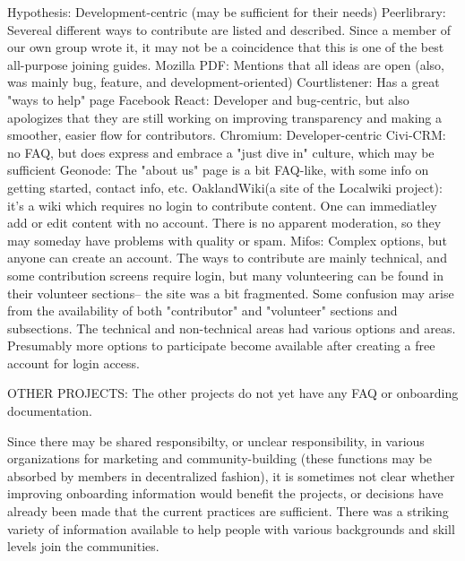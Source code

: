 Hypothesis: Development-centric (may be sufficient for their needs)
Peerlibrary: Severeal different ways to contribute are listed and described. Since a member of our own group wrote it, it may not be a coincidence that this is one of the best all-purpose joining guides.
Mozilla PDF: Mentions that all ideas are open (also, was mainly bug, feature, and development-oriented)
Courtlistener: Has a great "ways to help" page
Facebook React: Developer and bug-centric, but also apologizes that they are still working on improving transparency and making a smoother, easier flow for contributors.
Chromium: Developer-centric
Civi-CRM: no FAQ, but does express and embrace a  "just dive in" culture, which may be sufficient
Geonode: The "about us" page is a bit FAQ-like, with some info on getting started, contact info, etc.
OaklandWiki(a site of the Localwiki project): it's a wiki which requires no login to contribute content. One can immediatley add or edit content with no account. There is no apparent moderation, so they may someday have problems with quality or spam.
Mifos: Complex options, but anyone can create an account. The ways to contribute are mainly technical, and some contribution screens require login, but many volunteering can be found in their volunteer sections-- the site was a bit fragmented. Some confusion may arise from the availability of both "contributor" and "volunteer" sections and subsections. The technical and non-technical areas had various options and areas. Presumably more options to participate become available after creating a free account for login access.

OTHER PROJECTS: The other projects do not yet have any FAQ or onboarding documentation.

Since there may be shared responsibilty, or unclear responsibility, in various organizations for marketing and community-building (these functions may be absorbed by members in decentralized fashion), it is sometimes not clear whether improving onboarding information would benefit the projects, or decisions have already been made that the current practices are sufficient. There was a striking variety of information available to help people with various backgrounds and skill levels join the communities. 





